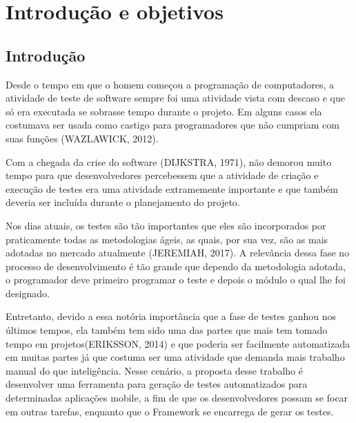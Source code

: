 \documentclass[
    12pt,       %
    openright,      %
    twoside,      %
    a4paper,      %
    english,      %
    french,       %
    spanish,      %
    brazil,       %
    ]{abntex2}
\begin{document}
  \tableofcontents*
  \cleardoublepage



  \textual


  \chapter{Introdução e objetivos}
  \section{Introdução}
      Desde o tempo em que o homem começou a programação de computadores, a atividade
  de teste de software sempre foi uma atividade vista com descaso e que só era
  executada se sobrasse tempo durante o projeto. Em alguns casos ela costumava ser
  usada como castigo para programadores que não cumpriam com suas funções
  (WAZLAWICK, 2012).

  Com a chegada da crise do software (DIJKSTRA, 1971), não demorou muito tempo
  para que desenvolvedores percebessem que a atividade de criação e execução de
  testes era uma atividade extramemente importante e que também deveria ser
  incluída durante o planejamento do projeto.

  Nos dias atuais, os testes são tão importantes que eles são incorporados
  por praticamente todas as metodologias ágeis, as quais, por sua vez,
  são as mais adotadas no mercado atualmente (JEREMIAH, 2017). A relevância dessa fase
  no processo de desenvolvimento é tão grande que dependo da metodologia
  adotada, o programador deve primeiro programar o teste e depois o módulo
  o qual lhe foi designado.

  Entretanto, devido a essa notória importância que a fase de testes ganhou nos
  últimos tempos, ela também tem sido uma das partes que mais tem tomado tempo
  em projetos(ERIKSSON, 2014) e que poderia ser facilmente automatizada em muitas partes já que
  costuma ser uma atividade que demanda mais trabalho manual do que inteligência.
  Nesse cenário, a proposta desse trabalho é desenvolver uma ferramenta para
  geração de testes automatizados para determinadas aplicações mobile, a fim de
  que os desenvolvedores possam se focar em outras tarefas, enquanto
  que o Framework se encarrega de gerar os testes.
\end{document}
